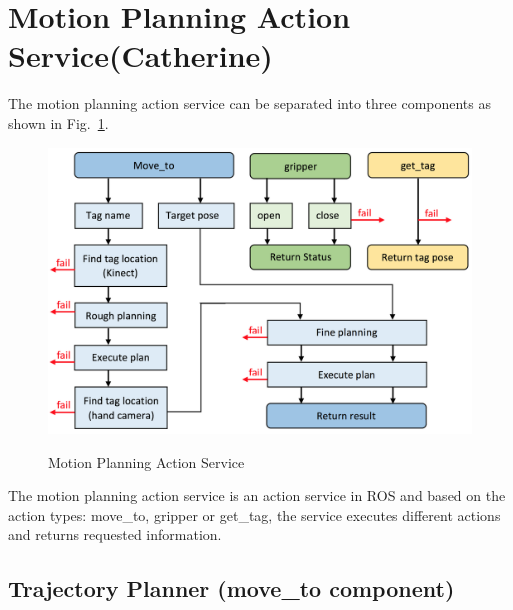 \section{Motion Planning Action Service(Catherine)}



The motion planning action service can be separated into three components as shown in Fig.~\ref{fig:plan}.

\begin{figure}[ht!]%
\centering
{\includegraphics[width=0.95\columnwidth]{pics/motion_planning_flow.png}}
\caption{Motion Planning Action Service}
\label{fig:plan}
\end{figure}

The motion planning action service is an action service in ROS and based on the action types: move\_to, gripper or get\_tag, the service executes different actions and returns requested information.

\subsection{Trajectory Planner (move\_to component)}

